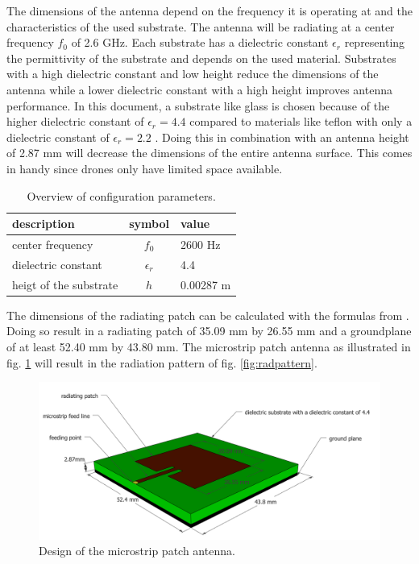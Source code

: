 \documentclass[twocolumn]{phdsymp} %
\begin{document}
The dimensions of the antenna depend on the frequency it is operating at and the characteristics of the used substrate.
The antenna will be radiating at a center frequency $f_0$ of 2.6 GHz. Each substrate has a dielectric constant $\epsilon_r$ representing 
the permittivity of the substrate and depends on the used material.
Substrates with a high dielectric constant and low height 
reduce the dimensions of the antenna
while a lower dielectric constant with a high height improves antenna performance. 
In this document, a substrate like glass 
is chosen because of the higher dielectric constant of $\epsilon_r = 4.4$ compared to materials like teflon with only a dielectric 
constant of $\epsilon_r = 2.2$ \cite{J14_antennadesign}. 
Doing this in combination with an antenna height of 2.87 mm will decrease the dimensions of the entire antenna surface.
This comes in handy since drones only have limited space available.

\begin{table}[h!]
\centering
\begin{tabular}{|l|c|l|}
\hline
 description            & symbol          & value         \\    \hline
 center frequency       & $f_0$           & 2600 Hz       \\ 
 dielectric constant    & $\epsilon_r$    & 4.4         \\ 
 heigt of the substrate & $h$             & 0.00287 m    \\ \hline
\end{tabular}
\caption{Overview of configuration parameters.}
\label{table:antennaparas}
\end{table}

The dimensions of the radiating patch can be calculated with the formulas from \cite{J14_antennadesign, J15_antennadesign}.
Doing so result in a radiating patch of 35.09 mm by 26.55 mm and a groundplane of at least 52.40 mm by 43.80 mm.
The microstrip patch antenna as illustrated in fig. \ref{fig:basicpatchantenna} will result in the radiation pattern of fig. \ref{fig:radpattern}.
\begin{figure}[h!]
\centering
  \includegraphics[width=\linewidth]{MicrostripAntenna.png}
  \caption{Design of the microstrip patch antenna.}
  \label{fig:basicpatchantenna}
\end{figure}
\end{document}
